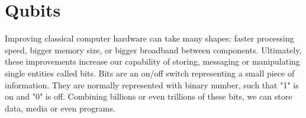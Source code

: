 
\section{Qubits}
Improving classical computer hardware can take many shapes: faster processing speed, bigger memory size, or bigger broadband between components. Ultimately, these improvements increase our capability of storing, messaging or manipulating single entities called bits. Bits are an on/off switch representing a small piece of information. They are normally represented with binary number, such that "1" is on and "0" is off. Combining billions or even trillions of these bits, we can store data, media or even programs.

